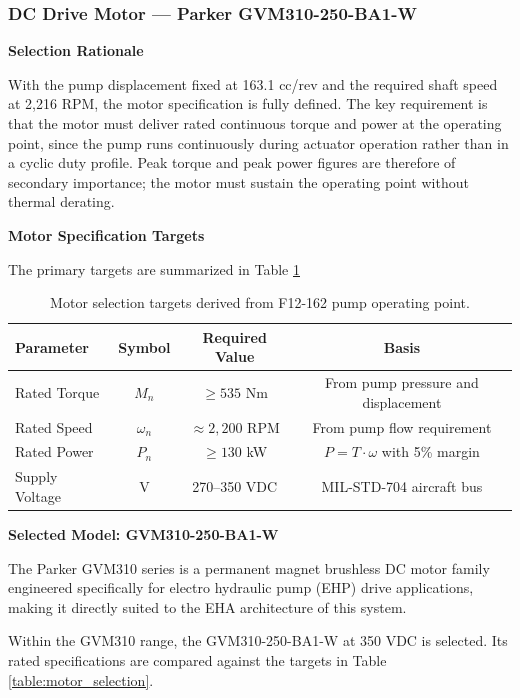 \documentclass[
bindingoffset=5mm,  %
footnoteindent=3mm, %
hyphenation=true    %
]{src/wut-thesis}
\begin{document}
	\subsubsection{DC Drive Motor — Parker GVM310-250-BA1-W}
	
	\textbf{Selection Rationale}
	
	With the pump displacement fixed at 163.1 cc/rev and the required shaft speed at 2,216 RPM, the motor specification is fully defined. The key requirement is that the motor must deliver rated continuous torque and power at the operating point, since the pump runs continuously during actuator operation rather than in a cyclic duty profile.
	Peak torque and peak power figures are therefore of secondary importance; the motor must sustain the operating point without thermal derating.
	
	\textbf{Motor Specification Targets}
	
	The primary targets are summarized in Table \ref{table:motor_targets}
	
	\begin{table}[htbp]
		\centering
		\begin{tabular}{l c c c}
			\toprule
			Parameter & Symbol &Required Value & Basis \\
			\midrule
			Rated Torque &$M_n$ & $\geq 535$ Nm & From pump pressure and displacement \\
			Rated Speed& $\omega_{n}$ & $\approx 2,200$ RPM & From pump flow requirement \\
			Rated Power& $P_n$ & $\geq 130$ kW & $P = T \cdot \omega$ with 5\% margin \\
			Supply Voltage& V & 270--350 VDC & MIL-STD-704 aircraft bus \\
			\bottomrule
		\end{tabular}
		\caption{Motor selection targets derived from F12-162 pump operating point.}
		\label{table:motor_targets}
	\end{table}
	
	\textbf{Selected Model: GVM310-250-BA1-W}
	
	The Parker GVM310 series is a permanent magnet brushless DC motor family engineered specifically for electro hydraulic pump (EHP) drive applications, making it directly suited to the EHA architecture of this system.
	
	Within the GVM310 range, the GVM310-250-BA1-W at 350 VDC is selected. Its rated specifications are compared against the targets in Table \ref{table:motor_selection}.
	
\end{document}
